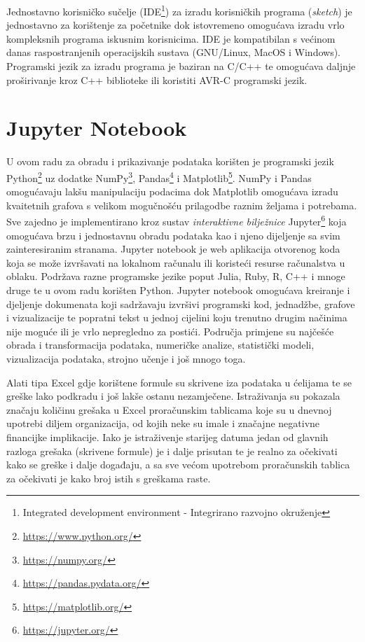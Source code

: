 Jednostavno korisničko sučelje (IDE\footnote{Integrated development environment - Integrirano razvojno okruženje}) za izradu korisničkih programa (\textit{sketch}) je jednostavno za korištenje za početnike dok istovremeno omogućava izradu vrlo kompleksnih programa iskusnim korisnicima. 
IDE je kompatibilan s većinom danas raspostranjenih operacijskih sustava (GNU/Linux, MacOS i Windows).
Programski jezik za izradu programa je baziran na C/C++ te omogućava daljnje proširivanje kroz C++ biblioteke ili koristiti AVR-C programski jezik.

\section{Jupyter Notebook}
U ovom radu za obradu i prikazivanje podataka korišten je programski jezik Python\footnote{\url{https://www.python.org/}} uz dodatke NumPy\footnote{\url{https://numpy.org/}}, Pandas\footnote{\url{https://pandas.pydata.org/}} i Matplotlib\footnote{\url{https://matplotlib.org/}}.
NumPy i Pandas omogućavaju lakšu manipulaciju podacima dok Matplotlib omogućava izradu kvaitetnih grafova s velikom mogučnošću prilagodbe raznim željama i potrebama.
Sve zajedno je implementirano kroz sustav \emph{interaktivne bilježnice} Jupyter\footnote{\url{https://jupyter.org/}} koja omogućava brzu i jednostavnu obradu podataka kao i njeno dijeljenje sa svim zainteresiranim stranama.
Jupyter notebook je web aplikacija otvorenog koda koja se može izvršavati na lokalnom računalu ili koristeći resurse računalstva u oblaku.
Podržava razne programske jezike poput Julia, Ruby, R, C++ i mnoge druge te u ovom radu korišten Python.
Jupyter notebook omogućava kreiranje i djeljenje dokumenata koji sadržavaju izvršivi programski kod, jednadžbe, grafove i vizualizacije te popratni tekst u jednoj cijelini koju trenutno drugim načinima nije moguće ili je vrlo nepregledno za postići.
Područja primjene su najčešće obrada i transformacija podataka, numeričke analize, statistički modeli, vizualizacija podataka, strojno učenje i još mnogo toga.

Alati tipa Excel gdje korištene formule su skrivene iza podataka u ćelijama te se greške lako podkradu i još lakše ostanu nezamječene. 
Istraživanja su pokazala značaju količinu grešaka u Excel proračunskim tablicama koje su u dnevnoj upotrebi diljem organizacija, od kojih neke su imale i značajne negativne financijke implikacije\cite{panko1998we}. 
Iako je istraživenje starijeg datuma jedan od glavnih razloga grešaka (skrivene formule) je i dalje prisutan te je realno za očekivati kako se greške i dalje događaju, a sa sve većom upotrebom proračunskih tablica za očekivati je kako broj istih s greškama raste.

